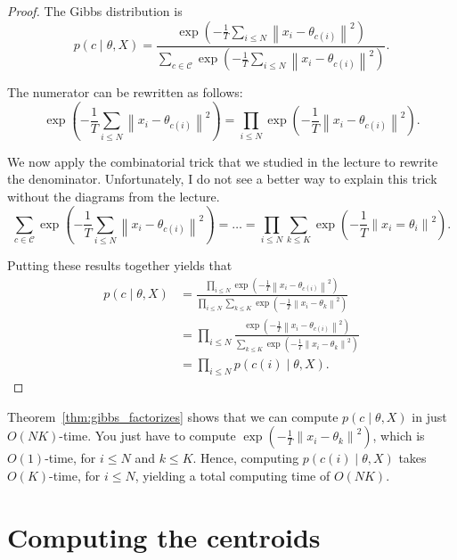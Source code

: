 \begin{proof}
The Gibbs distribution is
%
\begin{equation}
p(c \mid \theta, X) = \frac{\exp\left(- \frac{1}{T}\sum_{i \leq N}\left\|x_i - \theta_{c(i)}\right\|^2\right)}{\sum_{c \in \mathcal{C}}\exp\left(- \frac{1}{T}\sum_{i \leq N}\left\|x_i - \theta_{c(i)}\right\|^2\right)}.
\end{equation}

The numerator can be rewritten as follows:
%
\begin{equation}
\exp\left(- \frac{1}{T}\sum_{i \leq N}\left\|x_i - \theta_{c(i)}\right\|^2\right) = \prod_{i \leq N}\exp\left(- \frac{1}{T}\left\|x_i - \theta_{c(i)}\right\|^2\right).
\end{equation}

We now apply the combinatorial trick that we studied in the lecture
to rewrite the denominator. Unfortunately, I do not see a better way to explain this trick without the diagrams from the lecture.
%
\begin{equation}
\sum_{c \in \mathcal{C}} \exp\left(- \frac{1}{T}\sum_{i \leq N}\left\|x_i - \theta_{c(i)}\right\|^2\right) = \ldots = \prod_{i \leq N} \sum_{k \leq K} \exp\left(-\frac{1}{T}\left\|x_i = \theta_i\right\|^2\right).
\end{equation}

Putting these results together yields that
%
\begin{align}
p(c \mid \theta, X) &= \frac{\prod_{i \leq N}\exp\left(- \frac{1}{T}\left\|x_i - \theta_{c(i)}\right\|^2\right)}{\prod_{i \leq N}\sum_{k \leq K}\exp\left(- \frac{1}{T}\left\|x_i - \theta_{k}\right\|^2\right)}\\
&= \prod_{i \leq N}\frac{\exp\left(- \frac{1}{T}\left\|x_i - \theta_{c(i)}\right\|^2\right)}{\sum_{k \leq K}\exp\left(- \frac{1}{T}\left\|x_i - \theta_{k}\right\|^2\right)}\\
&= \prod_{i \leq N}p(c(i) \mid \theta, X).
\end{align}
\end{proof} 

Theorem~\ref{thm:gibbs_factorizes} shows that we can compute $p(c \mid \theta, X)$ in just $O(NK)$-time.
You just have to compute $\exp\left(- \frac{1}{T}\left\|x_i - \theta_k\right\|^2\right)$, which is $O(1)$-time, for $i \leq N$ and $k \leq K$. Hence, computing $p(c(i) \mid \theta, X)$ takes $O(K)$-time, for $i \leq N$, yielding a total computing time of $O(NK)$.

\section{Computing the centroids}
\label{sec:computing_centroids}

